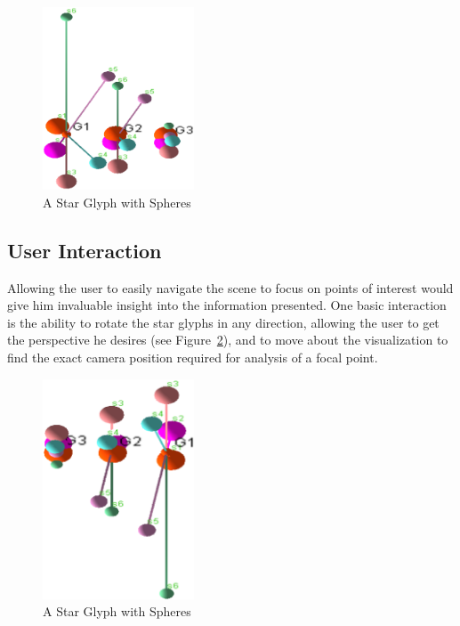 \documentclass[]{article}
\begin{document}
\begin{figure}[htb]
\begin{center}
\includegraphics[width=0.4\textwidth, keepaspectratio=true]{images/multiple}
\end{center}
\caption{A Star Glyph with Spheres}
\label {fig:multiple}
\end{figure}

\subsection{User Interaction}
\label{ss:user_interaction}

Allowing the user to easily navigate the scene to focus on points of interest would give him invaluable insight into the information presented.  One basic interaction is the ability to rotate the star glyphs in any direction, allowing the user to get the perspective he desires (see Figure~\ref{fig:angle}), and to move about the visualization to find the exact camera position required for analysis of a focal point.

\begin{figure}[htb]
\begin{center}
\includegraphics[width=0.4\textwidth, keepaspectratio=true]{images/angle}
\end{center}
\caption{A Star Glyph with Spheres}
\label {fig:angle}
\end{figure}
\end{document}
